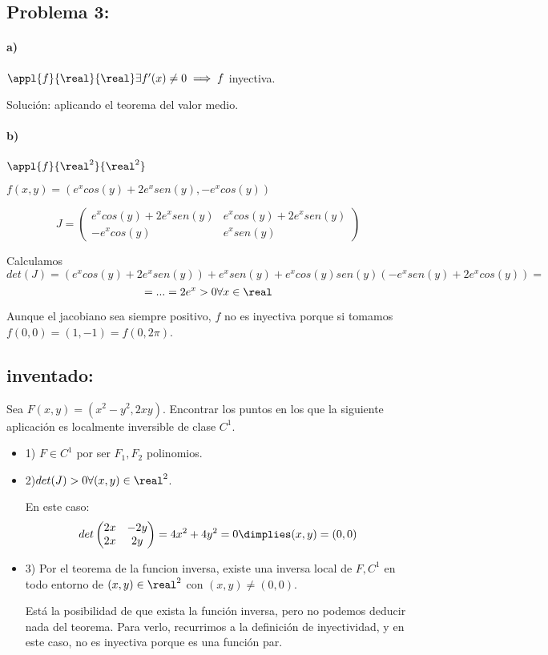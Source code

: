 \documentclass{apuntes}
\begin{document}
\subsection{Problema 3:}
\paragraph{a)}

$\appl{f}{\real}{\real} \exists f'(x) \neq 0 \implies f$ inyectiva.

Solución: aplicando el teorema del valor medio.

\paragraph{b)}
$\appl{f}{\real^2}{\real^2}$

$f(x,y) =( e^xcos(y) + 2e^xsen(y),-e^xcos(y))$

$$J = \begin{pmatrix}
       e^xcos(y)+2e^xsen(y) & e^xcos(y)+2e^xsen(y) \\
       -e^xcos(y) & e^xsen(y)
      \end{pmatrix}
$$

Calculamos $$det(J) = (e^xcos(y)+2e^xsen(y))+e^xsen(y) + e^xcos(y)sen(y)(-e^xsen(y)+2e^xcos(y)) = $$
$$ = ... = 2e^x > 0 \forall x \in \real$$

Aunque el jacobiano sea siempre positivo, $f$ no es inyectiva porque si tomamos $f(0,0) = (1,-1) = f(0,2\pi)$.

\subsection{inventado:}
\label{inventado}
Sea $F(x,y) = (x^2-y^2,2xy)$. Encontrar los puntos en los que la siguiente aplicación es localmente inversible de clase $C^1$.

\begin{itemize}
 \item 1) $F \in C^1$ por ser $F_1,F_2$ polinomios.
 \item 2)$det(J)>0 \forall (x,y)\in \real^2$. 
 
 En este caso: $$det\begin{pmatrix}
                  2x&-2y\\
                  2x&2y
                 \end{pmatrix} = 4x^2 + 4y^2 = 0 \dimplies (x,y) = (0,0)$$           
 \item 3) Por el teorema de la funcion inversa, existe una inversa local de $F,C^1$ en todo entorno de $(x,y) \in \real^2$ con $(x,y)\neq (0,0)$. 
 
 Está la posibilidad de que exista la función inversa, pero no podemos deducir nada del teorema. Para verlo, recurrimos a la definición de inyectividad, y en este caso, no es inyectiva porque es una función par.
 \end{itemize}
\end{document}

